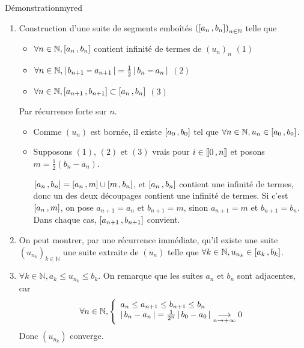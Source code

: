     \begin{demo}{Démonstration}{myred}
        \begin{enumerate}
            \item Construction d’une suite de segments emboîtés $\left( \left[ a_n \, , b_n \right] \right)_{n \in \mathbb{N}}$ telle que 
            \begin{itemize}
                \item $\forall n \in \mathbb{N}, \left[ a_n \, , b_n \right]$ contient infinité de termes de $(u_n)_n$ \quad $(1)$
                \item $\forall n \in \mathbb{N}, \left\lvert \,b_{n+1} - a_{n+1} \, \right\rvert = \frac{1}{2} \left\lvert \,b_n - a_n \, \right\rvert$ \quad $(2)$
                \item $\forall n \in \mathbb{N}, \left[ a_{n+1} \, , b_{n+1} \right] \subset \left[ a_n \, , b_n \right]$ \quad $(3)$
            \end{itemize}
            Par récurrence forte sur $n$.
            \begin{itemize}
                \item Comme $(u_n)$ est bornée, il existe $\left[ a_0 \, , b_0 \right]$ tel que $\forall n \in \mathbb{N}, u_n \in \left[ a_0 \, , b_0 \right]$. 
                \item Supposons $(1)$, $(2)$ et $(3)$ vrais pour $i \in \left\llbracket 0 \, , n \right\rrbracket$ et posons $m = \frac{1}{2}(b_n - a_n)$. 
                
                $\left[ a_n \, , b_n \right] = \left[ a_n \, , m \right] \cup \left[ m \, , b_n \right]$, et $\left[ a_n \, , b_n \right]$ contient une infinité de termes, donc un des deux découpages contient une infinité de termes. Si c’est $\left[ a_n \, , m \right]$, on pose $a_{n+1} = a_n$ et $b_{n+1} = m$, sinon $a_{n+1} = m$ et $b_{n+1} = b_n$. Dans chaque cas, $\left[ a_{n+1} \, , b_{n+1} \right]$ convient.
            \end{itemize}
            \item On peut montrer, par une récurrence immédiate, qu’il existe une suite $(u_{n_k})_{k \in \mathbb{N}}$ une suite extraite de $(u_n)$ telle que $\forall k \in \mathbb{N}, u_{n_k} \in \left[ a_k \, , b_k \right]$.
            \item $\forall k \in \mathbb{N}, a_k \leq u_{n_k} \leq b_k$. On remarque que les suites $a_n$ et $b_n$ sont adjacentes, car 
            \[ \forall n \in \mathbb{N}, \et{a_n \leq a_{n+1} \leq b_{n+1} \leq b_n}{\abs{b_n - a_n} = \frac{1}{2^n} \abs{b_0 - a_0} \limi{n}{+\infty} 0} \] 
            Donc $(u_{n_k})$ converge.
        \end{enumerate}
    \end{demo}


